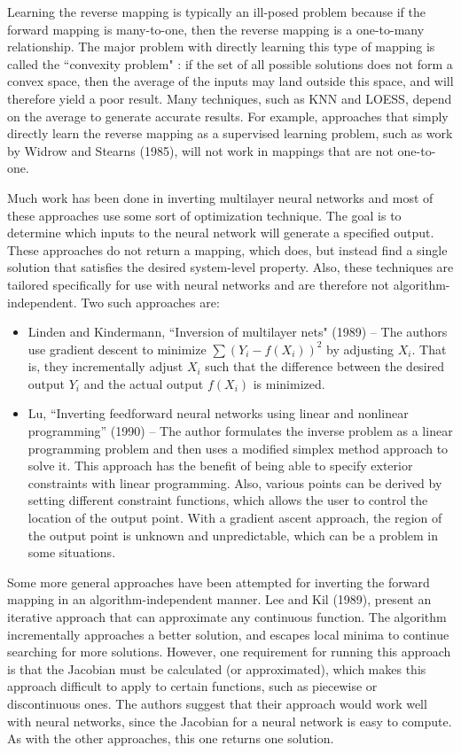 Learning the reverse mapping is typically an ill-posed problem because if the forward mapping is many-to-one, then the reverse mapping is a one-to-many relationship.
The major problem with directly learning this type of mapping is called the ``convexity problem" \cite{jordan-forward}: if the set of all possible solutions does not form a convex space, then the average of the inputs may land outside this space, and will therefore yield a poor result.
Many techniques, such as KNN and LOESS, depend on the average to generate accurate results.
For example,  approaches that simply directly learn the reverse mapping as a supervised learning problem, such as work by Widrow and Stearns (1985),\nocite{widrow1985adaptive} will not work in mappings that are not one-to-one.

Much work has been done in inverting multilayer neural networks and most of these approaches use some sort of optimization technique.
The goal is to determine which inputs to the neural network will generate a specified output.
These approaches do not return a mapping, which \fw does, but instead find a single solution that satisfies the desired system-level property.
Also, these techniques are tailored specifically for use with neural networks and are therefore not algorithm-independent.
Two such approaches are:
\begin{itemize}
\item Linden and Kindermann, ``Inversion of multilayer nets" (1989)\nocite{linden1989inversion} --
The authors use gradient descent to minimize $\sum (Y_i - f(X_i))^2$ by adjusting $X_i$.
That is, they incrementally adjust $X_i$ such that the difference between the desired output $Y_i$ and the actual output $f(X_i)$ is minimized.
\item Lu,  ``Inverting feedforward neural networks using linear and nonlinear programming'' (1990)\nocite{lu1999inverting} -- 
The author formulates the inverse problem as a linear programming problem and then uses a modified simplex method approach to solve it.
This approach has the benefit of being able to specify exterior constraints with linear programming.
Also, various points can be derived by setting different constraint functions, which allows the user to control the location of the output point.
With a gradient ascent approach, the region of the output point is unknown and unpredictable, which can be a problem in some situations.
\end{itemize}

Some more general approaches have been attempted for inverting the forward mapping in an algorithm-independent manner.
Lee and Kil (1989)\nocite{lee1994inverse}, present an iterative approach that can approximate any continuous function.
The algorithm incrementally approaches a better solution, and escapes local minima to continue searching for more solutions.
However, one requirement for running this approach is that the Jacobian must be calculated (or approximated), which makes this approach difficult to apply to certain functions, such as piecewise or discontinuous ones.
The authors suggest that their approach would work well with neural networks, since the Jacobian for a neural network is easy to compute.
As with the other approaches, this one returns one solution.

